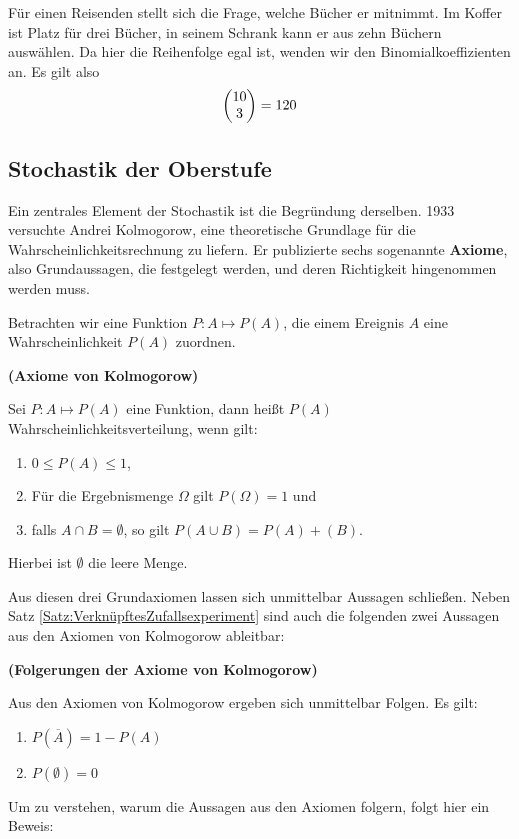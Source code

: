 \documentclass[ngerman, 12pt]{nssheetxea}
\begin{document}
\begin{example}
Für einen Reisenden stellt sich die Frage, welche Bücher er mitnimmt. Im Koffer ist Platz für drei Bücher, in seinem Schrank kann er aus zehn Büchern auswählen. Da hier die Reihenfolge egal ist, wenden wir den Binomialkoeffizienten an. Es gilt also
\[ \colvec{10}{3} = 120\]
\end{example}

\newpage
\subsection{Stochastik der Oberstufe}
\label{ssec:StochDerObst}
Ein zentrales Element der Stochastik ist die Begründung derselben. 1933 versuchte Andrei Kolmogorow, eine theoretische Grundlage für die Wahrscheinlichkeitsrechnung zu liefern. Er publizierte sechs sogenannte \textbf{Axiome}, also Grundaussagen, die festgelegt werden, und deren Richtigkeit hingenommen werden muss. \par
Betrachten wir eine Funktion $P:A\mapsto P(A)$, die einem Ereignis $A$ eine Wahrscheinlichkeit $P(A)$ zuordnen.
\begin{definition} \textbf{(Axiome von Kolmogorow)} \par
Sei $P:A\mapsto P(A)$ eine Funktion, dann heißt $P(A)$ Wahrscheinlichkeitsverteilung, wenn gilt:
\begin{enumerate}
\item $0\leq P(A) \leq 1$,
\item Für die Ergebnismenge $\Omega$ gilt $P(\Omega) = 1$ und
\item falls $A\cap B = \emptyset$, so gilt $P(A \cup B) = P(A)+(B)$.
\end{enumerate}
Hierbei ist $\emptyset$ die leere Menge.
\label{Def:Axiome_Kolmogorow}
\end{definition}

Aus diesen drei Grundaxiomen lassen sich unmittelbar Aussagen schließen. Neben Satz \ref{Satz:VerknüpftesZufallsexperiment} sind auch die folgenden zwei Aussagen aus den Axiomen von Kolmogorow ableitbar:

\begin{theorem} \textbf{(Folgerungen der Axiome von Kolmogorow)} \par
Aus den Axiomen von Kolmogorow ergeben sich unmittelbar Folgen. Es gilt:
\begin{enumerate}
\item $P(\overline{A})=1-P(A)$
\item $P(\emptyset)=0$
\end{enumerate}
\end{theorem}
Um zu verstehen, warum die Aussagen aus den Axiomen folgern, folgt hier ein Beweis:
\end{document}
